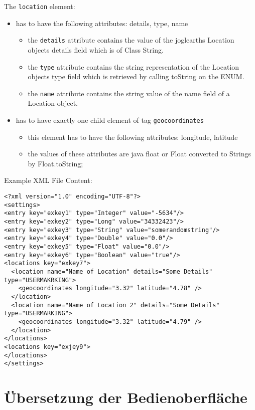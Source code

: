 \documentclass[10pt]{scrreprt}
\begin{document}
 The \texttt{location} element:
\begin{itemize}
 \item has to have the following attributes: details, type, name
 \begin{itemize}
  \item the \texttt{details} attribute contains the value of the joglearths Location objects details field which is of Class String.
  \item the \texttt{type} attribute contains the string representation of the Location objects type field which is retrieved by calling toString on the ENUM.
  \item the \texttt{name} attribute contains the string value of the name field of a Location object.
  \end{itemize}
 \item has to have exactly one child element of tag \texttt{geocoordinates}
 \begin{itemize}
  \item this element has to have the following attributes: longitude, latitude
  \item the values of these attributes are java float or Float converted to Strings by Float.toString;
 \end{itemize}
\end{itemize}

Example XML File Content:
\lstset{language=XML}
\begin{lstlisting}[frame=single]
<?xml version="1.0" encoding="UTF-8"?>
<settings>
<entry key="exkey1" type="Integer" value="-5634"/>
<entry key="exkey2" type="Long" value="34332423"/>
<entry key="exkey3" type="String" value="somerandomstring"/>
<entry key="exkey4" type="Double" value="0.0"/>
<entry key="exkey5" type="Float" value="0.0"/>
<entry key="exkey6" type="Boolean" value="true"/>
<locations key="exkey7">
  <location name="Name of Location" details="Some Details" type="USERMAKRKING">
    <geocoordinates longitude="3.32" latitude="4.78" />
  </location>
  <location name="Name of Location 2" details="Some Details" type="USERMARKING">
    <geocoordinates longitude="3.32" latitude="4.79" />
  </location>
</locations>
<locations key="exjey9">
</locations>
</settings>
\end{lstlisting}


\chapter{Übersetzung der Bedienoberfläche}
\end{document}
